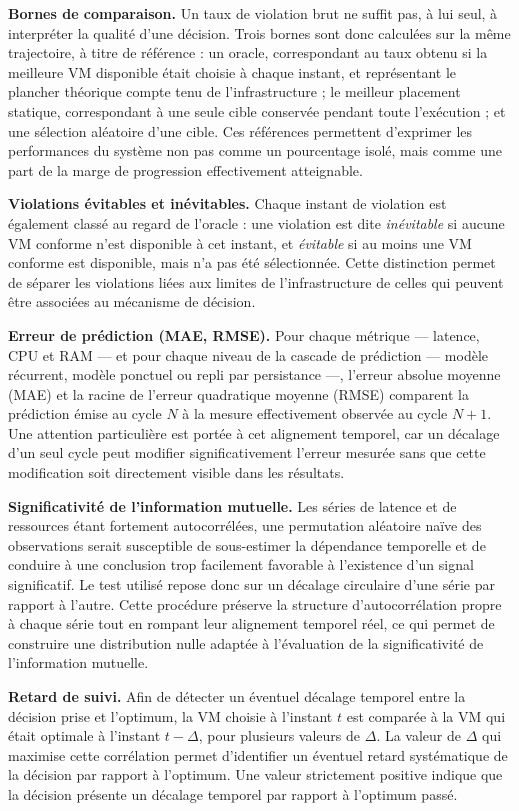 \textbf{Bornes de comparaison.} Un taux de violation brut ne suffit pas, à lui seul, à interpréter la qualité d'une décision. Trois bornes sont donc calculées sur la même trajectoire, à titre de référence : un oracle, correspondant au taux obtenu si la meilleure VM disponible était choisie à chaque instant, et représentant le plancher théorique compte tenu de l'infrastructure ; le meilleur placement statique, correspondant à une seule cible conservée pendant toute l'exécution ; et une sélection aléatoire d'une cible. Ces références permettent d'exprimer les performances du système non pas comme un pourcentage isolé, mais comme une part de la marge de progression effectivement atteignable.

\textbf{Violations évitables et inévitables.} Chaque instant de violation est également classé au regard de l'oracle : une violation est dite \emph{inévitable} si aucune VM conforme n'est disponible à cet instant, et \emph{évitable} si au moins une VM conforme est disponible, mais n'a pas été sélectionnée. Cette distinction permet de séparer les violations liées aux limites de l'infrastructure de celles qui peuvent être associées au mécanisme de décision.

\textbf{Erreur de prédiction (MAE, RMSE).} Pour chaque métrique — latence, CPU et RAM — et pour chaque niveau de la cascade de prédiction — modèle récurrent, modèle ponctuel ou repli par persistance —, l'erreur absolue moyenne (MAE) et la racine de l'erreur quadratique moyenne (RMSE) comparent la prédiction émise au cycle $N$ à la mesure effectivement observée au cycle $N+1$. Une attention particulière est portée à cet alignement temporel, car un décalage d'un seul cycle peut modifier significativement l'erreur mesurée sans que cette modification soit directement visible dans les résultats.

\textbf{Significativité de l'information mutuelle.} Les séries de latence et de ressources étant fortement autocorrélées, une permutation aléatoire naïve des observations serait susceptible de sous-estimer la dépendance temporelle et de conduire à une conclusion trop facilement favorable à l'existence d'un signal significatif. Le test utilisé repose donc sur un décalage circulaire d'une série par rapport à l'autre. Cette procédure préserve la structure d'autocorrélation propre à chaque série tout en rompant leur alignement temporel réel, ce qui permet de construire une distribution nulle adaptée à l'évaluation de la significativité de l'information mutuelle.

\textbf{Retard de suivi.} Afin de détecter un éventuel décalage temporel entre la décision prise et l'optimum, la VM choisie à l'instant $t$ est comparée à la VM qui était optimale à l'instant $t - \Delta$, pour plusieurs valeurs de $\Delta$. La valeur de $\Delta$ qui maximise cette corrélation permet d'identifier un éventuel retard systématique de la décision par rapport à l'optimum. Une valeur strictement positive indique que la décision présente un décalage temporel par rapport à l'optimum passé.

